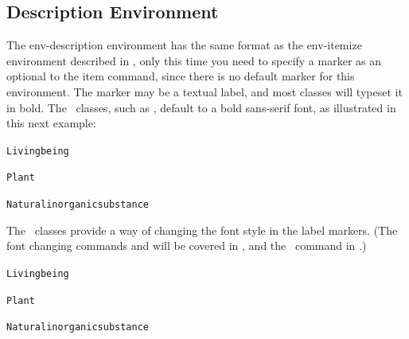 
\subsection{Description Environment}
\label{sec:description}

The \gls{env-description} environment has the same format as
the \gls{env-itemize} environment described in
, only this time you need to
specify a marker as an \gls{optional} to
the \gls{item} command, since there is no default marker
for this environment. The marker may be a textual label, and most
classes will typeset it in bold. The \koma\ classes, such as
, default to a bold sans-serif font, as illustrated
in this next example:

\begin{code}
\begin{alltt}
   Living being

   Plant
 
   Natural inorganic substance
\end{alltt}
\end{code}
\begin{result}
\dodescriptionexample
\end{result}

The \koma\ classes provide a way of changing the font style in
the  label markers. (The font changing commands
 and  will be covered in 
, and the \koma\ command
 in .)

\begin{code}
\begin{alltt}
   Living being

   Plant

   Natural inorganic substance
\end{alltt}
\end{code}
\begin{result}
\dodescriptionkomaexample
\end{result}

